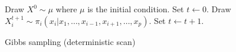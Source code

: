 \begin{algorithm}
\begin{algorithmic}
  \tophrule
  \STATE Draw $X^0\sim\mu$ where $\mu$ is the initial condition.
  \STATE Set $t\leftarrow0$.
  \REPEAT
      \STATE Draw
      $X_i^{t+1}\sim\pi_i(x_i|x_1,\dots,x_{i-1},x_{i+1},\dots,x_p)$.
    \ENDFOR
    \STATE Set $t\leftarrow t+1$.
  \bottomhrule
\end{algorithmic}
\caption{Gibbs sampling (deterministic scan)}
\label{alg:gibbs}
\end{algorithm}
